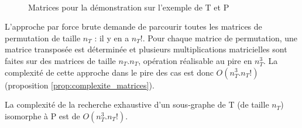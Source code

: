 \begin{figure}[ht]
\begin{center}
  \quad
  \quad
{}\\
\end{center}
\caption{Matrices pour la démonstration sur l'exemple de T et P}
\label{fig:mat-exemplesub}
\end{figure}



L'approche par force brute demande de parcourir toutes les matrices de permutation de taille $n_T$ : il y en a $n_T!$. Pour chaque matrice de permutation, une matrice transposée est déterminée et plusieurs multiplications matricielles sont faites sur des matrices de taille $n_T.n_T$, opération réalisable au pire en $n_T^3$. La complexité de cette approche dans le pire des cas est donc $O(n_T^3.n_T!)$ (proposition \ref{prop:complexite_matrices}).

\begin{prop}
La complexité de la recherche exhaustive d'un sous-graphe de T (de taille $n_T$) isomorphe à P est de $O(n_T^3.n_T!)$.
\label{prop:complexite_matrices}
\end{prop}

